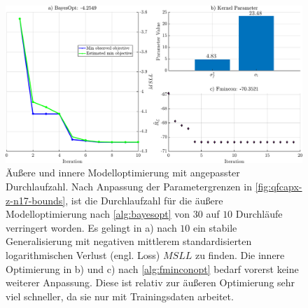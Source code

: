 \clearpage
\begin{figure}[tph]
	\centering
	\includegraphics[width=\linewidth]{chapters/images/4-EuOExp/QFCAPX-Z-N17-Opt}
	\caption[Äußere und innere Modelloptimierung mit angepasster Durchlaufzahl]{Äußere und innere Modelloptimierung mit angepasster Durchlaufzahl. Nach Anpassung der Parametergrenzen in \autoref{fig:qfcapx-z-n17-bounds}, ist die Durchlaufzahl für die äußere Modelloptimierung nach \autoref{alg:bayesopt} von $30$ auf $10$ Durchläufe verringert worden. Es gelingt in a) nach $10$ ein stabile Generalisierung mit negativen mittlerem standardisierten logarithmischen Verlust (engl. Loss) $MSLL$ zu finden. Die innere Optimierung in b) und c) nach \autoref{alg:fminconopt} bedarf vorerst keine weiterer Anpassung. Diese ist relativ zur äußeren Optimierung sehr viel schneller, da sie nur mit Trainingsdaten arbeitet.}
	\label{fig:qfcapx-z-n17-opt}
\end{figure}


\clearpage

